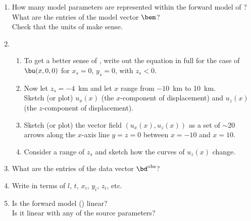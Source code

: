 \documentclass[11pt,titlepage,fleqn]{article}
\begin{document}
\begin{enumerate}
\item How many model parameters are represented within the forward model of ? \\
What are the entries of the model vector $\bem$? \\
Check that the units of  make sense.

\vspace{1cm}

\item 
\begin{enumerate}
\item To get a better sense of , write out the equation in full for the case of $\bu(x,0,0)$ for $x_s = 0$, $y_s = 0$, with $z_s < 0$.

\vspace{1cm}

\item Now let $z_s = -4$~km and let $x$ range from $-10$~km to 10~km. \\
Sketch (or plot) $u_x(x)$ (the $x$-component of displacement) and $u_z(x)$ (the $z$-component of displacement).

\vspace{4cm}

\item Sketch (or plot) the vector field $(u_x(x), u_z(x))$ as a set of $\sim$20 arrows along the $x$-axis line $y = z = 0$ between $x = -10$ and $x = 10$.

\vspace{4cm}

\item Consider a range of $z_s$ and sketch how the curves of $u_z(x)$ change.
\vspace{4cm}

\end{enumerate}

\item What are the entries of the data vector $\bd^{\rm obs}$?

\vspace{1.5cm}

\item Write  in terms of $l$, $t$, $x_i$, $y_i$, $z_i$, etc.

\vspace{1cm}

\item Is the forward model () linear? \\
Is it linear with any of the source parameters?


\end{enumerate}
\end{document}
